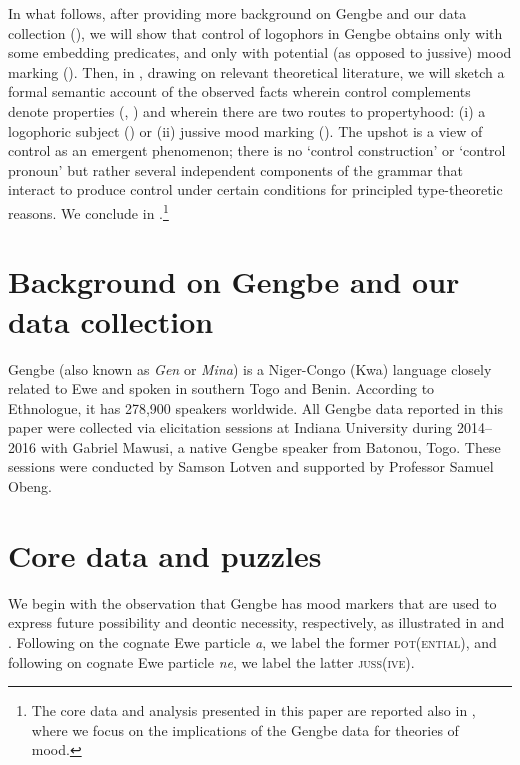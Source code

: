 \documentclass[output=paper,modfonts,nonflat]{langsci/langscibook}
\begin{document}
In what follows, after providing more background on Gengbe and our data collection (), we will show that control of  logophors in Gengbe obtains only with some embedding predicates, and only with potential (as opposed to jussive) mood marking (). Then, in , drawing on  relevant theoretical literature, we will sketch a formal semantic account of the observed facts wherein control complements denote properties (\citealt{Chierchi1984}, \citealt{Dowty1985}) and wherein there are two routes to propertyhood: (i) a logophoric subject (\citealt{Pearson2015}) or (ii) jussive mood marking (\citealt{Zanuttini2012}). The upshot is a view of control as an emergent phenomenon; there is no `control construction' or `control pronoun' but rather several independent components of the grammar that interact to produce control under certain conditions for principled type-theoretic reasons. We conclude in .\footnote{The core data and analysis presented in this paper are reported also in \cite{GranoToappear}, where we focus on the implications of the Gengbe data for theories of mood.}

 

\section{Background on Gengbe and our data collection}
\label{sec:Grano:GengbeBackground:2}

Gengbe (also known as \emph{Gen} or \emph{Mina}) is a Niger-Congo (Kwa) language closely related to Ewe and spoken in southern Togo and Benin. According to Ethnologue, it has 278,900 speakers worldwide.  All Gengbe data reported in this paper were collected via elicitation sessions at Indiana University during 2014--2016 with Gabriel Mawusi, a native Gengbe speaker from Batonou, Togo. These sessions were conducted by Samson Lotven and supported by Professor Samuel Obeng.



\section{Core data and puzzles}
\label{sec:Grano:CoreData:3}

We begin with the observation that Gengbe has mood markers that are used to express future possibility and deontic necessity, respectively, as illustrated in  and . Following \cite{Essegbey2008} on the  cognate  Ewe particle \emph{a}, we label the former \textsc{pot}(\textsc{ential}), and following \cite{Amek2008} on  cognate Ewe particle \emph{ne}, we label the latter \textsc{juss}(\textsc{ive}).
\end{document}
